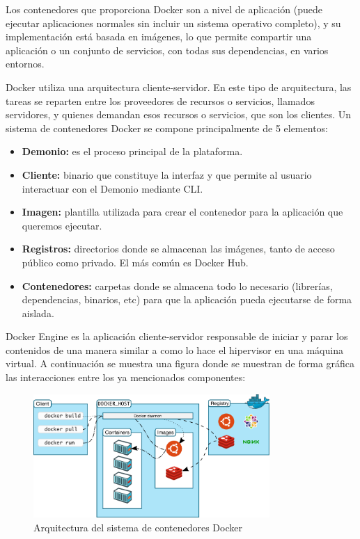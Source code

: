	Los contenedores que proporciona Docker son a nivel de aplicación (puede ejecutar aplicaciones normales sin incluir un sistema operativo completo), y su implementación está basada en imágenes, lo que permite compartir una aplicación o un conjunto de servicios, con todas sus dependencias, en varios entornos.

	Docker utiliza una arquitectura cliente-servidor. En este tipo de arquitectura, las tareas se reparten entre los proveedores de recursos o servicios, llamados servidores, y quienes demandan esos recursos o servicios, que son los clientes. Un sistema de contenedores Docker se compone principalmente de 5 elementos:~\cite{docker2}

	\begin{itemize}
		\item \textbf{Demonio:} es el proceso principal de la plataforma.
		\item \textbf{Cliente:} binario que constituye la interfaz y que permite al usuario interactuar con el Demonio mediante CLI.
		\item \textbf{Imagen:} plantilla utilizada para crear el contenedor para la aplicación que queremos ejecutar.
		\item \textbf{Registros:} directorios donde se almacenan las imágenes, tanto de acceso público como privado. El más común es Docker Hub.
		\item \textbf{Contenedores:} carpetas donde se almacena todo lo necesario (librerías, dependencias, binarios, etc) para que la aplicación pueda ejecutarse de forma aislada.
	\end{itemize}

	Docker Engine es la aplicación cliente-servidor responsable de iniciar y parar los contenidos de una manera similar a como lo hace el hipervisor en una máquina virtual. A continuación se muestra una figura donde se muestran de forma gráfica las interacciones entre los ya mencionados componentes:
	\begin{figure}[h]
	\centering
	\includegraphics[width=0.8\textwidth]{../imgs/EdA/docker-arch.png}
	\caption{Arquitectura del sistema de contenedores Docker}
	\label{fig:docker-arch}
	\end{figure}
	
